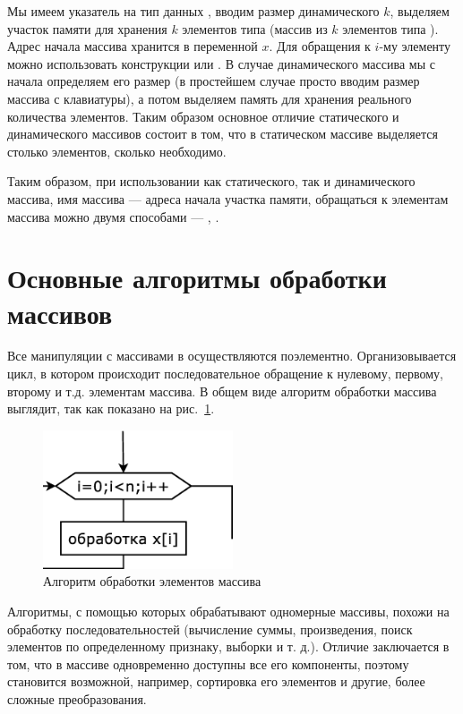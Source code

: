 Мы имеем указатель на тип данных , вводим размер динамического $k$, выделяем
участок памяти для хранения $k$ элементов типа  (массив из
$k$  элементов типа ). Адрес начала массива хранится в переменной
$x$. Для обращения к $i$-му элементу можно использовать конструкции  или
. В случае динамического массива мы с начала определяем его размер (в простейшем случае просто
вводим размер массива с клавиатуры), а потом выделяем память для хранения реального количества элементов. Таким образом
основное отличие статического и динамического массивов состоит в том, что в статическом массиве выделяется столько
элементов, сколько необходимо.

Таким образом, при использовании как статического, так и динамического массива, имя массива --- адреса начала участка
памяти, обращаться к элементам массива можно двумя способами --- , .

\section[Основные алгоритмы обработки массивов]{Основные алгоритмы обработки массивов}
Все манипуляции с массивами в  осуществляются поэлементно. Организовывается цикл, в котором происходит
последовательное обращение к нулевому, первому, второму и т.д. элементам массива. В общем виде алгоритм обработки
массива выглядит, так как показано на рис.~\ref{ch05:refDrawing0}.

\begin{figure}[htb]
\begin{center}
\includegraphics[width=0.5\textwidth]{img/ris_5_1}
\caption{Алгоритм обработки элементов массива}
\label{ch05:refDrawing0}
\end{center}
\end{figure}

Алгоритмы, с помощью которых обрабатывают одномерные массивы, похожи на обработку последовательностей (вычисление суммы,
произведения, поиск элементов по определенному признаку, выборки и т. д.). Отличие заключается в том, что в массиве
одновременно доступны все его компоненты, поэтому становится возможной, например, сортировка его элементов и другие,
более сложные преобразования.

